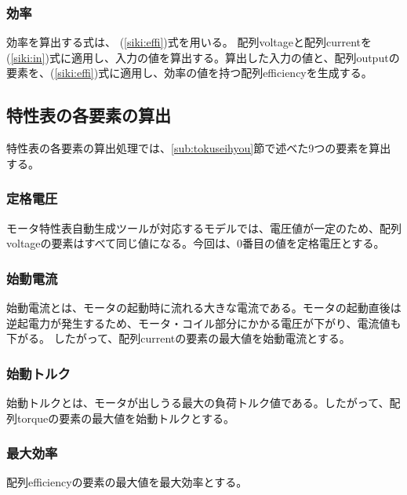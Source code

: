 \subsubsection{効率}\label{sub:sub:kouritu}
効率を算出する式は、%
(\ref{siki:effi})式を用いる。
配列voltageと配列currentを(\ref{siki:in})式に適用し、入力の値を算出する。算出した入力の値と、配列outputの要素を、(\ref{siki:effi})式に適用し、効率の値を持つ配列efficiencyを生成する。

\subsection{特性表の各要素の算出}\label{sub:youso_mortoku}
特性表の各要素の算出処理では、\ref{sub:tokuseihyou}節で述べた9つの要素を算出する。

\subsubsection{定格電圧}\label{sub:sub:dennatu}
モータ特性表自動生成ツールが対応するモデルでは、電圧値が一定のため、配列voltageの要素はすべて同じ値になる。今回は、0番目の値を定格電圧とする。

\subsubsection{始動電流}\label{sub:sub:sidouden}
始動電流とは、モータの起動時に流れる大きな電流である。モータの起動直後は逆起電力が発生するため、モータ・コイル部分にかかる電圧が下がり、電流値も下がる。
したがって、配列currentの要素の最大値を始動電流とする。

\subsubsection{始動トルク}\label{sub:sub:teidoutoruku}
始動トルクとは、モータが出しうる最大の負荷トルク値である。したがって、配列torqueの要素の最大値を始動トルクとする。

\subsubsection{最大効率}\label{sub:sub:saidaikouritu}
配列efficiencyの要素の最大値を最大効率とする。


